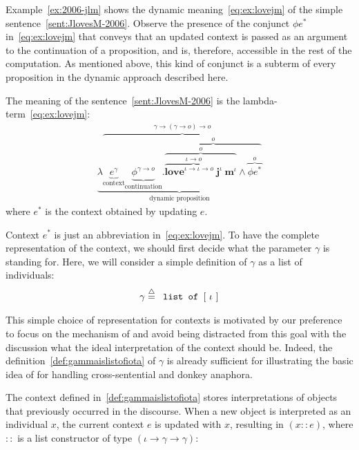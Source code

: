 Example~\ref{ex:2006-jlm} shows the dynamic meaning~\eqref{eq:ex:lovejm} of the simple sentence~\eqref{sent:JlovesM-2006}. Observe the presence of the conjunct $\phi e^*$ in~\eqref{eq:ex:lovejm} that conveys that an updated context is passed as an argument to the continuation of a proposition, and is, therefore, accessible in the rest of the computation. As mentioned above, this kind of conjunct is a subterm of every proposition in the dynamic approach described here.
 \begin{example} \label{ex:2006-jlm} The meaning of the sentence~\eqref{sent:JlovesM-2006} is the lambda-term~\eqref{eq:ex:lovejm}:
\begin{align}
\underbrace{\lambda \overbrace{\underbrace{e^{\gamma}}_{\text{context}} \underbrace{\phi^{\gamma \rightarrow o}}_{\text{continuation}}.  \overbrace{\overbrace{ \overbrace{\textbf{love}^{\iota \rightarrow \iota \rightarrow o}  \ \textbf{j}^{\iota}}^{\iota \rightarrow o} \ \textbf{m}^{\iota}}^{o} \land \overbrace{\phi e^*}^{o}}^{o}}^{\gamma \rightarrow (\gamma \rightarrow o) \rightarrow o} }_{\text{dynamic proposition}} \label{eq:ex:lovejm}
\end{align}
\indent where  $e^*$ is the context obtained by updating $e$.
\end{example}

 Context $e^*$ is just an abbreviation in~\eqref{eq:ex:lovejm}. To have the complete representation of the context, we should first decide what the parameter $\gamma$ is standing for. Here, we will consider a simple definition of $\gamma$ as a list of individuals:
\begin{align} \label{def:gammaislistofiota}
\gamma \stackrel{{\scriptstyle\triangle}}{=} \texttt{ list of } [ \ \iota \ ]  
\end{align}
 
 This simple choice of representation for contexts is motivated  by our preference to focus on the mechanism of {\FullName} and avoid being distracted from this goal with the discussion what the ideal interpretation of the context should be. Indeed, the definition~\eqref{def:gammaislistofiota} of $\gamma$ is already sufficient for illustrating the basic idea of {\TDL} for handling cross-sentential and donkey anaphora.
 
The context defined in~\eqref{def:gammaislistofiota}  stores interpretations of objects that previously occurred in the discourse. When a new object is interpreted as an individual $x$, the current context $e$ is updated with $x$, resulting in $(x::e)$, where $::$ is a list constructor of type $(\iota \rightarrow \gamma \rightarrow \gamma)$:

